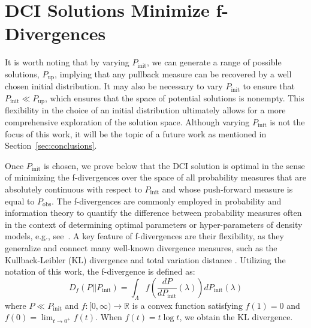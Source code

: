 \documentclass{article}
\newcommand{\p}{\mathbb{P}}
\newcommand{\B}{\mathcal{B}}
\newcommand{\pspace}{\Lambda}
\newcommand{\initmeas}{P_{\text{init}}}
\newcommand{\updatemeas}{P_{\text{up}}}
\newcommand{\obsmeas}{P_{\text{obs}}}
\DeclareMathOperator*{\argmin}{arg\,min}
\begin{document}
\section{DCI Solutions Minimize f-Divergences}\label{sec:f-divergence-solns}

It is worth noting that by varying $\initmeas$, we can generate a range of possible solutions, $\updatemeas$, implying that any pullback measure can be recovered by a well chosen initial distribution. 
It may also be necessary to vary $\initmeas$ to ensure that $\initmeas \ll \updatemeas$, which ensures that the space of potential solutions is nonempty. 
This flexibility in the choice of an initial distribution ultimately allows for a more comprehensive exploration of the solution space.
Although varying $\initmeas$ is not the focus of this work, it will be the topic of a future work as mentioned in Section~\ref{sec:conclusions}.

Once $\initmeas$ is chosen, we prove below that the DCI solution is optimal in the sense of minimizing the f-divergences over the space of all probability measures that are absolutely continuous with respect to $\initmeas$ and whose push-forward measure is equal to $\obsmeas$. 
The f-divergences \cite{polyanskiy2022information} are commonly employed in probability and information theory to quantify the difference between probability measures often in the context of determining optimal parameters or hyper-parameters of density models, e.g., see~\cite{Guntuboyina2011, BKM17}. 
A key feature of f-divergences are their flexibility, as they generalize and connect many well-known divergence measures, such as the Kullback-Leibler (KL) divergence and total variation distance \cite{KL1951, RenyiKL2014, BKM17, AH21}.
Utilizing the notation of this work, the f-divergence is defined as:
\[
    D_{f}(P || P_\text{init}) = \int_\pspace f\left(\frac{dP}{dP_\text{init}}(\lambda)\right) dP_\text{init}(\lambda)
\]
where $P \ll P_\text{init}$ and \( f: [0, \infty) \to \mathbb{R} \) is a convex function satisfying \( f(1) = 0 \) and $f(0) = \lim_{t \rightarrow 0^{+}}f(t)$.
When $f(t)=t\log t$, we obtain the KL divergence.

\end{document}
